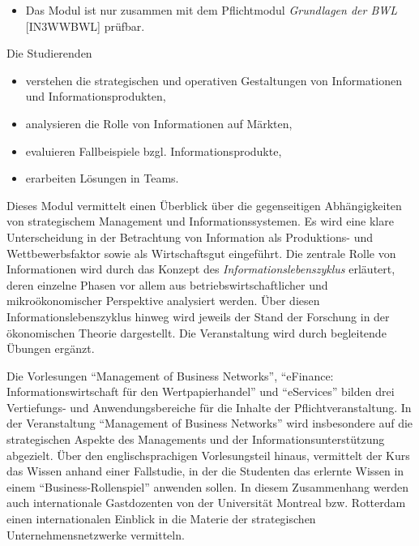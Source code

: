 \begin{module}
\begin{styleenv}
\begin{conditions}
 \begin{itemize}\item Das Modul ist nur zusammen mit dem Pflichtmodul \emph{Grundlagen der BWL} [IN3WWBWL] prüfbar.  \end{itemize}\end{conditions}


\end{styleenv}

\begin{learningoutcomes}
Die Studierenden

 \begin{itemize}\item verstehen die strategischen und operativen Gestaltungen von Informationen und Informationsprodukten,  \item analysieren die Rolle von Informationen auf Märkten,  \item evaluieren Fallbeispiele bzgl. Informationsprodukte,  \item erarbeiten Lösungen in Teams.  \end{itemize}
\end{learningoutcomes}

\begin{content}
Dieses Modul vermittelt einen Überblick über die gegenseitigen Abhängigkeiten von strategischem Management und Informationssystemen. Es wird eine klare Unterscheidung in der Betrachtung von Information als Produktions- und Wettbewerbsfaktor sowie als Wirtschaftsgut eingeführt. Die zentrale Rolle von Informationen wird durch das Konzept des \emph{Informationslebenszyklus} erläutert, deren einzelne Phasen vor allem aus betriebswirtschaftlicher und mikroökonomischer Perspektive analysiert werden. Über diesen Informationslebenszyklus hinweg wird jeweils der Stand der Forschung in der ökonomischen Theorie dargestellt. Die Veranstaltung wird durch begleitende Übungen ergänzt.

 

Die Vorlesungen “Management of Business Networks”, “eFinance: Informationswirtschaft für den Wertpapierhandel” und “eServices” bilden drei Vertiefungs- und Anwendungsbereiche für die Inhalte der Pflichtveranstaltung. In der Veranstaltung “Management of Business Networks” wird insbesondere auf die strategischen Aspekte des Managements und der Informationsunterstützung abgezielt. Über den englischsprachigen Vorlesungsteil hinaus, vermittelt der Kurs das Wissen anhand einer Fallstudie, in der die Studenten das erlernte Wissen in einem “Business-Rollenspiel” anwenden sollen. In diesem Zusammenhang werden auch internationale Gastdozenten von der Universität Montreal bzw. Rotterdam einen internationalen Einblick in die Materie der strategischen Unternehmensnetzwerke vermitteln.


\end{content}
\end{module}

